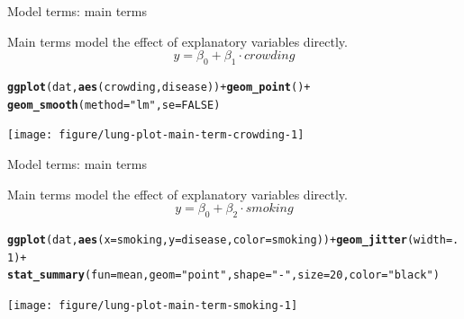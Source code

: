 \documentclass[table]{beamer}\usepackage[]{graphicx}\usepackage[]{color}
\makeatletter
\newcommand{\hlnum}[1]{\textcolor[rgb]{0.686,0.059,0.569}{#1}}%
\newcommand{\hlstr}[1]{\textcolor[rgb]{0.192,0.494,0.8}{#1}}%
\newcommand{\hlopt}[1]{\textcolor[rgb]{0,0,0}{#1}}%
\newcommand{\hlstd}[1]{\textcolor[rgb]{0.345,0.345,0.345}{#1}}%
\newcommand{\hlkwc}[1]{\textcolor[rgb]{0.333,0.667,0.333}{#1}}%
\newcommand{\hlkwd}[1]{\textcolor[rgb]{0.737,0.353,0.396}{\textbf{#1}}}%
\newenvironment{kframe}{%
 \def\at@end@of@kframe{}%
 \ifinner\ifhmode%
  \def\at@end@of@kframe{\end{minipage}}%
  \begin{minipage}{\columnwidth}%
 \fi\fi%
 \def\FrameCommand##1{\hskip\@totalleftmargin \hskip-\fboxsep
 \colorbox{shadecolor}{##1}\hskip-\fboxsep
     \hskip-\linewidth \hskip-\@totalleftmargin \hskip\columnwidth}%
 \MakeFramed {\advance\hsize-\width
   \@totalleftmargin\z@ \linewidth\hsize
   \@setminipage}}%
 {\par\unskip\endMakeFramed%
 \at@end@of@kframe}
\newenvironment{knitrout}{}{} %
\makeatother
\begin{document}
\begin{frame}[fragile]{Model terms: main terms}

Main terms model the effect of explanatory variables directly. $$y = \beta_0 + \beta_1 \cdot crowding $$

\begin{knitrout}\footnotesize
{}\color{fgcolor}\begin{kframe}
\begin{alltt}
\hlkwd{ggplot}\hlstd{(dat,} \hlkwd{aes}\hlstd{(crowding, disease))} \hlopt{+} \hlkwd{geom_point}\hlstd{()} \hlopt{+}
  \hlkwd{geom_smooth}\hlstd{(}\hlkwc{method}\hlstd{=}\hlstr{"lm"}\hlstd{,} \hlkwc{se}\hlstd{=}\hlnum{FALSE}\hlstd{)}
\end{alltt}
\end{kframe}
\texttt{[image: figure/lung-plot-main-term-crowding-1]} 
\end{knitrout}

\end{frame}


\begin{frame}[fragile]{Model terms: main terms}

Main terms model the effect of explanatory variables directly. $$y = \beta_0 + \beta_2 \cdot smoking$$

\begin{knitrout}\footnotesize
{}\color{fgcolor}\begin{kframe}
\begin{alltt}
\hlkwd{ggplot}\hlstd{(dat,} \hlkwd{aes}\hlstd{(}\hlkwc{x}\hlstd{=smoking,} \hlkwc{y}\hlstd{=disease,} \hlkwc{color}\hlstd{=smoking))} \hlopt{+} \hlkwd{geom_jitter}\hlstd{(}\hlkwc{width}\hlstd{=}\hlnum{.1}\hlstd{)} \hlopt{+}
  \hlkwd{stat_summary}\hlstd{(}\hlkwc{fun}\hlstd{=mean,} \hlkwc{geom}\hlstd{=}\hlstr{"point"}\hlstd{,} \hlkwc{shape}\hlstd{=}\hlstr{"-"}\hlstd{,} \hlkwc{size}\hlstd{=}\hlnum{20}\hlstd{,} \hlkwc{color}\hlstd{=}\hlstr{"black"}\hlstd{)}
\end{alltt}
\end{kframe}
\texttt{[image: figure/lung-plot-main-term-smoking-1]} 
\end{knitrout}

\end{frame}


\end{document}
